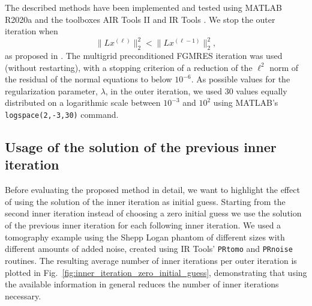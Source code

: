 The described methods have been implemented and tested using MATLAB R2020a and the toolboxes AIR Tools II \cite{art:HANS18} and IR Tools \cite{art:GAZZ19}. We stop the outer iteration when
\[
\|L x^{(\ell)}\|_2^2 < \|L x^{(\ell-1)}\|_2^2,
\]
as proposed in \cite{Gazzola_etal_2020}. The multigrid preconditioned
FGMRES iteration was used (without restarting), with a stopping
criterion of a reduction of the $\ell^2$ norm of the residual of the normal equations to below $10^{-6}$. As possible values for the regularization parameter, $\lambda$, in the outer iteration, we used 30 values equally distributed on a logarithmic scale between $10^{-3}$ and $10^{2}$ using MATLAB's \texttt{logspace(2,-3,30)} command.

\subsection{Usage of the solution of the previous inner iteration}
Before evaluating the proposed method in detail, we want to highlight the effect of using the solution of the inner iteration as initial guess. Starting from the second inner iteration instead of choosing a zero initial guess we use the solution of the previous inner iteration for each following inner iteration. We used a tomography example using the Shepp Logan phantom of different sizes with different amounts of added noise, created using IR Tools' \cite{art:GAZZ19} \texttt{PRtomo} and \texttt{PRnoise} routines. The resulting average number of inner iterations per outer iteration is plotted in Fig.~\ref{fig:inner_iteration_zero_initial_guess}, demonstrating that using the available information in general reduces the number of inner iterations necessary.
